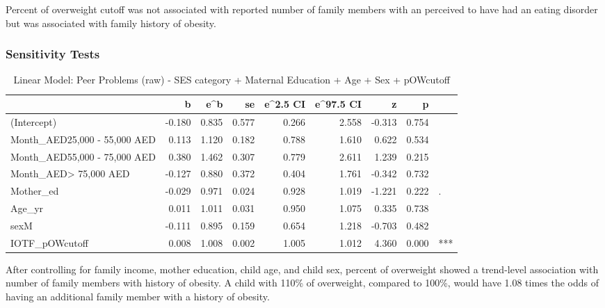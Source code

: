 \documentclass[
]{article}
\begin{document}
\FloatBarrier

Percent of overweight cutoff was not associated with reported number of
family members with an perceived to have had an eating disorder but was
associated with family history of obesity.

\FloatBarrier

\hypertarget{sensitivity-tests}{%
\subsubsection{Sensitivity Tests}\label{sensitivity-tests}}

\begin{table}[!h]

\caption{\label{tab:IOTF_pOWcutoff_nFam_poisson}Linear Model: Peer Problems (raw) - SES category + Maternal Education + Age + Sex + pOWcutoff}
\centering
\begin{tabular}[t]{lrrrrrrrl}
\toprule
  & b & e\textasciicircum{}b & se & e\textasciicircum{}2.5 CI & e\textasciicircum{}97.5 CI & z & p &  \\
\midrule
(Intercept) & -0.180 & 0.835 & 0.577 & 0.266 & 2.558 & -0.313 & 0.754 & \\
Month\_AED25,000 - 55,000 AED & 0.113 & 1.120 & 0.182 & 0.788 & 1.610 & 0.622 & 0.534 & \\
Month\_AED55,000 - 75,000 AED & 0.380 & 1.462 & 0.307 & 0.779 & 2.611 & 1.239 & 0.215 & \\
Month\_AED> 75,000 AED & -0.127 & 0.880 & 0.372 & 0.404 & 1.761 & -0.342 & 0.732 & \\
Mother\_ed & -0.029 & 0.971 & 0.024 & 0.928 & 1.019 & -1.221 & 0.222 & .\\
\addlinespace
Age\_yr & 0.011 & 1.011 & 0.031 & 0.950 & 1.075 & 0.335 & 0.738 & \\
sexM & -0.111 & 0.895 & 0.159 & 0.654 & 1.218 & -0.703 & 0.482 & \\
IOTF\_pOWcutoff & 0.008 & 1.008 & 0.002 & 1.005 & 1.012 & 4.360 & 0.000 & ***\\
\bottomrule
\end{tabular}
\end{table}

\FloatBarrier

After controlling for family income, mother education, child age, and
child sex, percent of overweight showed a trend-level association with
number of family members with history of obesity. A child with 110\% of
overweight, compared to 100\%, would have 1.08 times the odds of having
an additional family member with a history of obesity.
\end{document}
